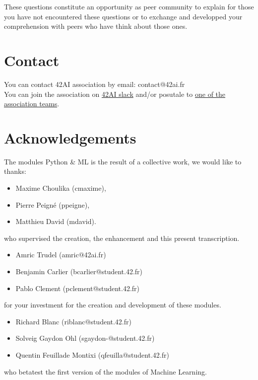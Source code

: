 \documentclass{42-en}
\begin{document}
These questions constitute an opportunity as peer community to explain for those you have not encountered these questions
or to exchange and developped your comprehension with peers who have think about those ones.


\newpage

\section*{Contact}
You can contact 42AI association by email: contact@42ai.fr\\
You can join the association on \href{https://join.slack.com/t/42-ai/shared_invite/zt-ebccw5r7-YPkDM6xOiYRPjqJXkrKgcA}{42AI slack}
and/or posutale to \href{https://forms.gle/VAFuREWaLmaqZw2D8}{one of the association teams}.

\section*{Acknowledgements}
The modules Python \& ML is the result of a collective work, we would like to thanks:
\begin{itemize}
  \item Maxime Choulika (cmaxime),
  \item Pierre Peigné (ppeigne),
  \item Matthieu David (mdavid).
\end{itemize}
who supervised the creation, the enhancement and this present transcription.

\begin{itemize}
  \item Amric Trudel (amric@42ai.fr)
  \item Benjamin Carlier (bcarlier@student.42.fr)
  \item Pablo Clement (pclement@student.42.fr)
\end{itemize}
for your investment for the creation and development of these modules.

\begin{itemize}
  \item Richard Blanc (riblanc@student.42.fr)
  \item Solveig Gaydon Ohl (sgaydon-@student.42.fr)
  \item Quentin Feuillade Montixi (qfeuilla@student.42.fr)
\end{itemize}
who betatest the first version of the modules of Machine Learning.
\vfill
\doclicenseThis
\end{document}
